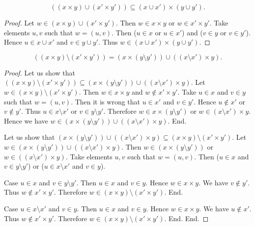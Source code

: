 \documentclass[../../sets-and-functions.ftl.tex]{subfiles}
\begin{document}
\begin{forthel}
    \begin{proposition}[SF 01 05 687547]
      $$((x \times y) \cup (x' \times y')) \subseteq (x \cup x') \times (y \cup y').$$
    \end{proposition}
    \begin{proof}
      Let $w \in (x \times y) \cup (x' \times y')$.
      Then $w \in x \times y$ or $w \in x' \times y'$.
      Take elements $u,v$ such that $w = (u,v)$.
      Then ($u \in x$ or $u \in x'$) and ($v \in y$ or $v \in y'$).
      Hence $u \in x \cup x'$ and $v \in y \cup y'$.
      Thus $w \in (x \cup x') \times (y \cup y')$.
    \end{proof}

    \begin{proposition}[SF 01 05 247770]
      $$((x \times y) \setminus (x' \times y')) = (x \times (y \setminus y')) \cup ((x \setminus x') \times y).$$
    \end{proposition}
    \begin{proof}
      Let us show that $((x \times y) \setminus (x' \times y')) \subseteq (x \times (y \setminus y')) \cup ((x \setminus x') \times y)$.
        Let $w \in (x \times y) \setminus (x' \times y')$.
        Then $w \in x \times y$ and $w \notin x' \times y'$.
        Take $u \in x$ and $v \in y$ such that $w = (u,v)$.
        Then it is wrong that $u \in x'$ and $v \in y'$.
        Hence $u \notin x'$ or $v \notin y'$.
        Thus $u \in x \setminus x'$ or $v \in y \setminus y'$.
        Therefore $w \in x \times (y \setminus y')$ or $w \in (x \setminus x') \times y$.
        Hence we have $w \in (x \times (y \setminus y')) \cup ((x \setminus x') \times y)$.
      End.

      Let us show that $(x \times (y \setminus y')) \cup ((x \setminus x') \times y) \subseteq (x \times y) \setminus (x' \times y')$.
        Let $w \in (x \times (y \setminus y')) \cup ((x \setminus x') \times y)$.
        Then $w \in (x \times (y \setminus y'))$ or $w \in ((x \setminus x') \times y)$.
        Take elements $u,v$ such that $w = (u,v)$.
        Then ($u \in x$ and $v \in y \setminus y'$) or ($u \in x \setminus x'$ and $v \in y$).

        Case $u \in x$ and $v \in y \setminus y'$.
          Then $u \in x$ and $v \in y$.
          Hence $w \in x \times y$.
          We have $v \notin y'$.
          Thus $w \notin x' \times y'$.
          Therefore $w \in (x \times y) \setminus (x' \times y')$.
        End.

        Case $u \in x \setminus x'$ and $v \in y$.
          Then $u \in x$ and $v \in y$.
          Hence $w \in x \times y$.
          We have $u \notin x'$.
          Thus $w \notin x' \times y'$.
          Therefore $w \in (x \times y) \setminus (x' \times y')$.
        End.
      End.
    \end{proof}
  \end{forthel}
\end{document}
